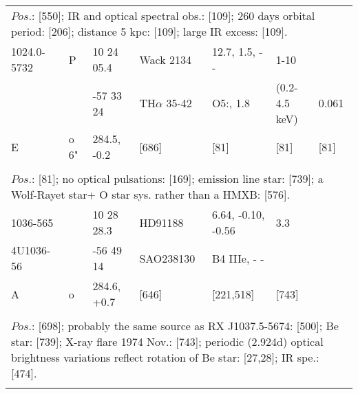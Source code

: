 \documentclass{aa}
\begin{document}
\begin{table*}[h]
\begin{tabular}{p{2.5cm}p{1cm}p{1.8cm}p{2.3cm}p{3.3cm}p{2.0cm}p{2.2cm}}
\\
\multicolumn{7}{p{17.5cm}}{
$Pos$.: [550]; IR and optical spectral obs.: [109]; 260 days orbital period: [206]; distance 5 kpc: [109]; large IR excess: [109].}\\

\noalign{\smallskip}
\hline
\noalign{\smallskip}
1024.0-5732    &   P        & 10 24 05.4     & Wack 2134                  & 12.7, 1.5, - -    &  1-10                     &                    \\
                          &              & -57 33 24       &  TH$\alpha$ 35-42     & O5:, 1.8           &  (0.2-4.5 keV)      &  0.061       \\
    E                    &  o 6"    & 284.5, -0.2     &   [686]                           &    [81]               &   [81]                      & [81]         \\
\\
\multicolumn{7}{p{17.5cm}}{
$Pos$.: [81]; no optical pulsations: [169]; emission line star: [739]; a Wolf-Rayet star+ O star sys. rather than a HMXB: [576].}\\

\noalign{\smallskip}
\hline
\noalign{\smallskip}
1036-565     &          & 10 28 28.3     & HD91188                 & 6.64, -0.10, -0.56   &  3.3             &              \\
4U1036-56 &           & -56 49 14       & SAO238130            & B4 IIIe, - -              &                     &              \\
    A              & o       & 284.6, +0.7    &   [646]                        & [221,518]               &   [743]         &              \\
\\
\multicolumn{7}{p{17.5cm}}{
$Pos$.: [698]; probably the same source as RX J1037.5-5674: [500]; Be star: [739]; X-ray flare 1974 Nov.: [743]; 
periodic (2.924d) optical brightness variations reflect rotation of Be star: [27,28]; IR spe.: [474].}\\

\noalign{\smallskip}
\hline
\end{tabular}
\end{table*}
\end{document}
